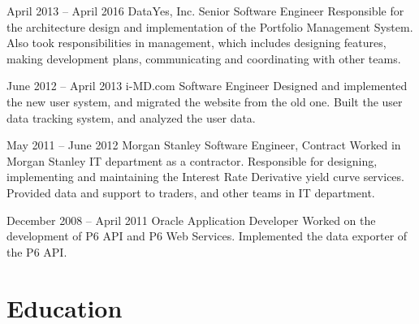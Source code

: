 \documentclass[
	10pt, %
]{FreemanCV}
\begin{document}
\begin{paracol}{2}

\jobentry
	{April 2013 -- April 2016} %
	{} %
	{DataYes, Inc.} %
	{Senior Software Engineer} %
	{Responsible for the architecture design and implementation of the Portfolio Management System. Also took responsibilities in management, which includes designing features, making development plans, communicating and coordinating with other teams.}


\jobentry
	{June 2012 -- April 2013} %
	{} %
	{i-MD.com} %
	{Software Engineer} %
	{Designed and implemented the new user system, and migrated the website from the old one. Built the user data tracking system, and analyzed the user data.} %


\jobentry
	{May 2011 -- June 2012} %
	{} %
	{Morgan Stanley} %
	{Software Engineer, Contract} %
	{Worked in Morgan Stanley IT department as a contractor. Responsible for designing, implementing and maintaining the Interest Rate Derivative yield curve services. Provided data and support to traders, and other teams in IT department.} %


\jobentry
	{December 2008 -- April 2011} %
	{} %
	{Oracle} %
	{Application Developer} %
	{Worked on the development of P6 API and P6 Web Services. Implemented the data exporter of the P6 API.} %


\section{Education} 



\end{paracol}
\end{document}
